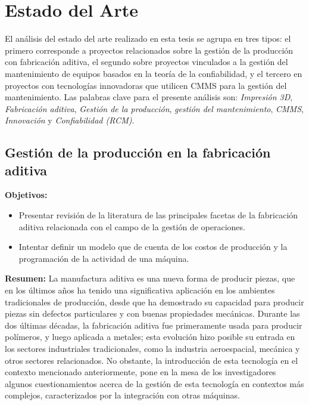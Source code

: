 \chapter{Estado del Arte}
\label{cap:estadodelarte}

El análisis del estado del arte realizado en esta tesis se agrupa en tres tipos: el primero corresponde a proyectos relacionados sobre la gestión de la producción con fabricación aditiva, el segundo sobre proyectos vinculados a la gestión del mantenimiento de equipos basados en la teoría de la confiabilidad, y el tercero en proyectos con tecnologías innovadoras que utilicen CMMS para la gestión del mantenimiento. Las palabras clave para el presente análisis son: \textit{Impresión 3D}, \textit{Fabricación aditiva}, \textit{Gestión de la producción}, \textit{gestión del mantenimiento}, \textit{CMMS}, \textit{Innovación} y \textit{Confiabilidad (RCM)}.

\section{Gestión de la producción en la fabricación aditiva}


\begin{description}
\item \textbf{Objetivos:}
\begin{itemize}
\item Presentar revisión de la literatura de las principales facetas de la fabricación aditiva relacionada con el campo de la gestión de operaciones.
\item Intentar definir un modelo que de cuenta de los costos de producción y la programación de la actividad de una máquina.  
\end{itemize}
\end{description}

\begin{description}
\item \textbf{Resumen:} La manufactura aditiva es una nueva forma de producir piezas, que en los últimos años ha tenido una significativa aplicación en los ambientes tradicionales de producción, desde que ha demostrado su capacidad para producir piezas sin defectos particulares y con buenas propiedades mecánicas. Durante las dos últimas décadas, la fabricación aditiva fue primeramente usada para producir polímeros, y luego aplicada a metales; esta evolución hizo posible su entrada en los sectores industriales tradicionales, como la industria aeroespacial, mecánica y otros sectores relacionados. No obstante, la introducción de esta tecnología en el contexto mencionado anteriormente, pone en la mesa de los investigadores algunos cuestionamientos acerca de la gestión de esta tecnología en contextos más complejos, caracterizados por la integración con otras máquinas.  
\end{description}

